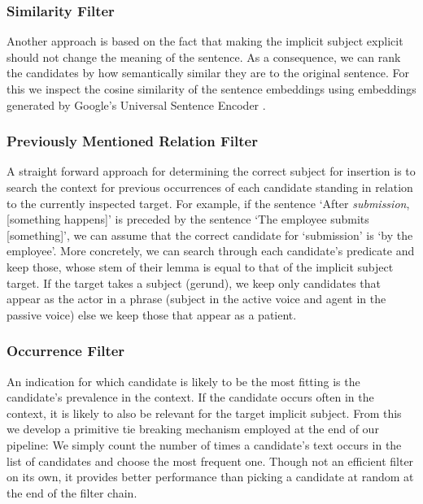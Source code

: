 \documentclass[times, 10pt,twocolumn]{article}
\begin{document}

\subsubsection{Similarity Filter}
Another approach is based on the fact that making the implicit subject explicit should not
change the meaning of the sentence. As a consequence, we can rank the candidates by how semantically
similar they are to the original sentence. For this we inspect the cosine similarity of the sentence
embeddings using embeddings generated by Google's Universal Sentence Encoder \cite{universal_sentence_encoder}.


\subsubsection{Previously Mentioned Relation Filter}
A straight forward approach for determining the correct subject for insertion is to search
the context for previous occurrences of each candidate standing in relation to the currently
inspected target. For example, if the sentence `After \textit{submission}, [something happens]'
is preceded by the sentence `The employee submits [something]', we can assume that the
correct candidate for `submission' is `by the employee'. More concretely, we can
search through each candidate's predicate and keep those, whose stem of their lemma is equal to that
of the implicit subject target. If the target takes a subject (gerund), we keep only
candidates that appear as the actor in a phrase (subject in the active voice and agent in the passive voice)
else we keep those that appear as a patient.


\subsubsection{Occurrence Filter}
An indication for which candidate is likely to be the most fitting is the candidate's prevalence in
the context. If the candidate occurs often in the context, it is likely to also be relevant for
the target implicit subject. From this we develop a primitive tie breaking mechanism employed at
the end of our pipeline: We simply count the number of times a candidate's text occurs in the
list of candidates and choose the most frequent one. Though not an efficient filter on its own,
it provides better performance than picking a candidate at random at the end of the filter chain.
\end{document}

